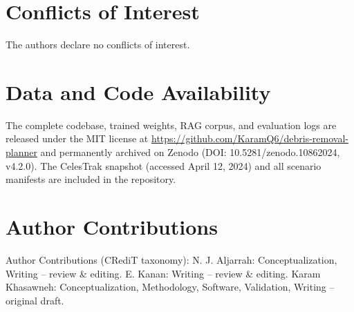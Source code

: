 \documentclass[10pt,conference,a4paper]{IEEEtran}
\begin{document}
\section*{Conflicts of Interest}
The authors declare no conflicts of interest.

\section*{Data and Code Availability}
The complete codebase, trained weights, RAG corpus, and evaluation logs are released under the MIT license at \url{https://github.com/KaramQ6/debris-removal-planner} and permanently archived on Zenodo (DOI: 10.5281/zenodo.10862024, v4.2.0). The CelesTrak snapshot (accessed April 12, 2024) and all scenario manifests are included in the repository.

\section*{Author Contributions}
Author Contributions (CRediT taxonomy): N. J. Aljarrah: Conceptualization, Writing -- review \& editing. E. Kanan: Writing -- review \& editing. Karam Khasawneh: Conceptualization, Methodology, Software, Validation, Writing -- original draft.
\end{document}
